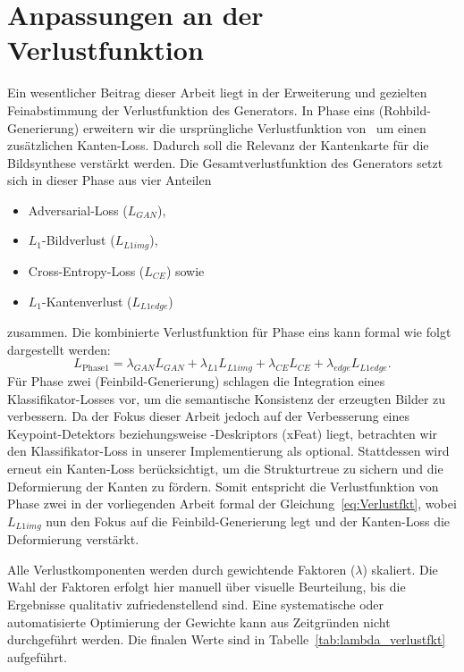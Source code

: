 {\section{Anpassungen an der Verlustfunktion}
Ein wesentlicher Beitrag dieser Arbeit liegt in der Erweiterung und gezielten Feinabstimmung der Verlustfunktion des Generators.
In Phase eins (Rohbild-Generierung) erweitern wir die ursprüngliche Verlustfunktion von~\textcite{He_2023_ICCV} um einen zusätzlichen Kanten-Loss.
Dadurch soll die Relevanz der Kantenkarte für die Bildsynthese verstärkt werden.
Die Gesamtverlustfunktion des Generators setzt sich in dieser Phase aus vier Anteilen
\begin{itemize}
    \item Adversarial-Loss ($L_{GAN}$),
    \item $L_1$-Bildverlust ($L_{L1img}$),
    \item Cross-Entropy-Loss ($L_{CE}$) sowie
    \item $L_1$-Kantenverlust ($L_{L1edge}$)
\end{itemize}
zusammen. Die kombinierte Verlustfunktion für Phase eins kann formal wie folgt dargestellt werden:
\begin{equation}
    L_{\mathrm{Phase1}} = \lambda_{GAN} L_{GAN} + \lambda_{L1} L_{L1img} + \lambda_{CE} L_{CE} + \lambda_{edge} L_{L1edge}.
    \label{eq:Verlustfkt}
\end{equation}
Für Phase zwei (Feinbild-Generierung) schlagen \textcite{He_2023_ICCV} die Integration eines Klassifikator-Losses vor, um die semantische Konsistenz der erzeugten Bilder zu verbessern. Da der Fokus dieser Arbeit jedoch auf der Verbesserung eines Keypoint-Detektors beziehungsweise -Deskriptors (\ac{xFeat}) liegt, betrachten wir den Klassifikator-Loss in unserer Implementierung als optional. Stattdessen wird erneut ein Kanten-Loss berücksichtigt, um die Strukturtreue zu sichern und die Deformierung der Kanten zu fördern. Somit entspricht die Verlustfunktion von Phase zwei in der vorliegenden Arbeit formal der Gleichung~\ref{eq:Verlustfkt}, wobei $L_{L1img}$ nun den Fokus auf die Feinbild-Generierung legt und der Kanten-Loss die Deformierung verstärkt.

Alle Verlustkomponenten werden durch gewichtende Faktoren ($\lambda$) skaliert. Die Wahl der Faktoren erfolgt hier manuell über visuelle Beurteilung, bis die Ergebnisse qualitativ zufriedenstellend sind. Eine systematische oder automatisierte Optimierung der Gewichte kann aus Zeitgründen nicht durchgeführt werden. Die finalen Werte sind in Tabelle~\ref{tab:lambda_verlustfkt} aufgeführt.

}
